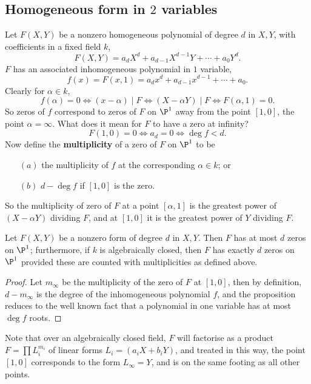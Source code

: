 \subsection{Homogeneous form in \boldmath$2$ variables}
Let $F(X,Y)$ be a nonzero homogeneous polynomial of degree $d$ in $X,Y$, with coefficients in a fixed field $k$,
\[F(X,Y)=a_dX^d+a_{d-1}X^{d-1}Y+\cdots+a_0Y^d.\]
$F$ has an associated inhomogeneous polynomial in $1$ variable,
\[f(x)=F(x,1)=a_dx^d+a_{d-1}x^{d-1}+\cdots+a_0.\]
Clearly for $\alpha\in k$,
\[f(\alpha)=0\iff (x-\alpha)\mid F\iff (X-\alpha Y)\mid F\iff F(\alpha,1)=0.\]
So zeros of $f$ correspond to zeros of $F$ on $\P^1$ away from the point $[1,0]$, the point $\alpha=\infty$. What does it mean for $F$ to have a zero at infinity?
\[F(1,0)=0\iff a_d=0\iff \deg f<d.\]
Now define the \textbf{multiplicity} of a zero of $F$ on $\P^1$ to be
\begin{itemize}
\item[$(a)$] the multiplicity of $f$ at the corresponding $\alpha\in k$; or
\item[$(b)$] $d-\deg f$ if $[1,0]$ is the zero.
\end{itemize}
So the multiplicity of zero of $F$ at a point $[\alpha,1]$ is the greatest power of $(X-\alpha Y)$ dividing $F$, and at $[1,0]$ it is the greatest power of $Y$ dividing $F$.
\begin{proposition}\label{form two var zero}
Let $F(X,Y)$ be a nonzero form of degree $d$ in $X,Y$. Then $F$ has at most $d$ zeros on $\P^1$; furthermore, if $k$ is algebraically closed, then $F$ has exactly $d$ zeros on $\P^1$ provided these are counted with multiplicities as defined above.
\end{proposition}
\begin{proof}
Let $m_\infty$ be the multiplicity of the zero of $F$ at $[1,0]$, then by definition, $d-m_\infty$ is the degree of the inhomogeneous polynomial $f$, and the proposition reduces to the well known fact that a polynomial in one variable has at most $\deg f$ roots.
\end{proof}
Note that over an algebraically closed field, $F$ will factorise as a product $F=\prod L_i^{m_i}$ of linear forms $L_i=(a_iX+b_iY)$, and treated in this way, the point $[1,0]$ corresponds to the form $L_\infty=Y$, and is on the same footing as all other points.
